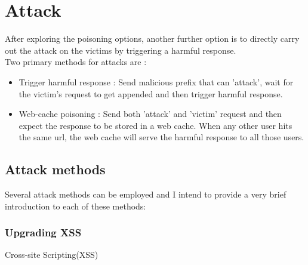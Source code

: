 \section{Attack}
After exploring the poisoning options, another further option is to directly carry out the attack on the victims by triggering a harmful response. \\
Two primary methods for attacks are :
\begin{itemize}
	\item Trigger harmful response : Send malicious prefix that can 'attack', wait for the victim's request to get appended and then trigger harmful response. 
	\item Web-cache poisoning : Send both 'attack' and 'victim' request and then expect the response to be stored in a web cache. When any other user hits the same url, the web cache will serve the harmful response to all those users. 
\end{itemize}

\subsection{Attack methods}
Several attack methods can be employed and I intend to provide a very brief introduction to each of these methods:
\subsubsection{Upgrading XSS}
Cross-site Scripting(XSS) \cite{b11}